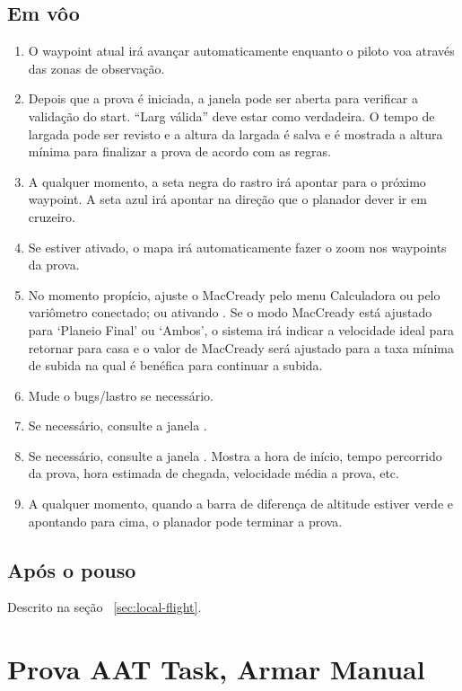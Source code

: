 \subsection*{Em vôo}
\begin{enumerate}
\item  O waypoint atual irá avançar automaticamente enquanto o piloto voa através das zonas de observação.
\item  Depois que a prova é iniciada, a janela   pode ser aberta para verificar a validação do start.  “Larg válida” deve estar como verdadeira.  O tempo de largada pode ser revisto e a altura da largada é salva e é mostrada a altura mínima para finalizar a prova de acordo com as regras.
\item  A qualquer momento, a seta negra do rastro irá apontar para o próximo waypoint.  A seta azul irá apontar na direção que o planador dever ir em cruzeiro.
\item  Se  estiver ativado, o mapa irá automaticamente fazer o zoom nos waypoints da prova.
\item  No momento propício, ajuste o MacCready pelo menu Calculadora ou pelo variômetro conectado; ou ativando   .
Se o modo MacCready está ajustado para ‘Planeio Final’ ou ‘Ambos’, o sistema irá indicar a velocidade ideal para retornar para casa e o valor de MacCready será ajustado para a taxa mínima de subida na qual é benéfica para continuar a subida.
\item  Mude o bugs/lastro se necessário.
\item  Se necessário, consulte a janela  . 
\item  Se necessário, consulte a janela  .  Mostra a hora de início, tempo percorrido da prova, hora estimada de chegada, velocidade média a prova, etc.
\item  A qualquer momento, quando a barra de diferença de altitude estiver verde e apontando para cima, o planador pode terminar a prova.

\end{enumerate}

\subsection*{Após o pouso}
Descrito na seção ~\ref{sec:local-flight}.


\section{Prova AAT Task, Armar Manual}\label{sec:aat-task-manual}

